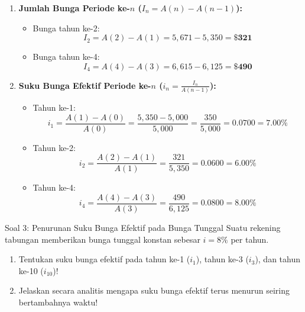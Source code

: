 \documentclass[11pt,a4paper]{article}
\begin{document}
\begin{solutionbox}[Soal 2]
\begin{enumerate}[label=(\alph*)]
    \item \textbf{Jumlah Bunga Periode ke-$n$ ($I_n = A(n) - A(n-1)$):}
    \begin{itemize}
        \item Bunga tahun ke-2: 
        \begin{equation*}
            I_2 = A(2) - A(1) = 5{,}671 - 5{,}350 = \mathbf{\$321}
        \end{equation*}
        \item Bunga tahun ke-4: 
        \begin{equation*}
            I_4 = A(4) - A(3) = 6{,}615 - 6{,}125 = \mathbf{\$490}
        \end{equation*}
    \end{itemize}

    \item \textbf{Suku Bunga Efektif Periode ke-$n$ ($i_n = \frac{I_n}{A(n-1)}$):}
    \begin{itemize}
        \item Tahun ke-1:
        \begin{equation*}
            i_1 = \frac{A(1) - A(0)}{A(0)} = \frac{5{,}350 - 5{,}000}{5{,}000} = \frac{350}{5{,}000} = 0.0700 = \mathbf{7.00\%}
        \end{equation*}
        \item Tahun ke-2:
        \begin{equation*}
            i_2 = \frac{A(2) - A(1)}{A(1)} = \frac{321}{5{,}350} = 0.0600 = \mathbf{6.00\%}
        \end{equation*}
        \item Tahun ke-4:
        \begin{equation*}
            i_4 = \frac{A(4) - A(3)}{A(3)} = \frac{490}{6{,}125} = 0.0800 = \mathbf{8.00\%}
        \end{equation*}
    \end{itemize}
\end{enumerate}
\end{solutionbox}

\vspace{1.2em}

\begin{problembox}{Soal 3: Penurunan Suku Bunga Efektif pada Bunga Tunggal}
Suatu rekening tabungan memberikan bunga tunggal konstan sebesar $i = 8\%$ per tahun.
\begin{enumerate}[label=(\alph*)]
    \item Tentukan suku bunga efektif pada tahun ke-1 ($i_1$), tahun ke-3 ($i_3$), dan tahun ke-10 ($i_{10}$)!
    \item Jelaskan secara analitis mengapa suku bunga efektif terus menurun seiring bertambahnya waktu!
\end{enumerate}
\end{problembox}
\end{document}
